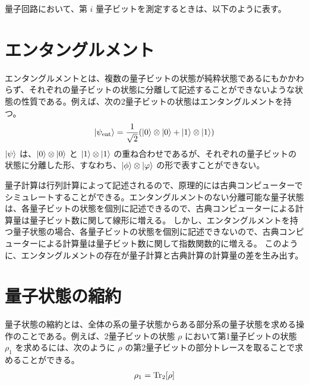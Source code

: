 量子回路において、第 $i$ 量子ビットを測定するときは、以下のように表す。
\begin{figure}[H]
    \centering
\end{figure}



\section{エンタングルメント}\label{sec:entanglement}
エンタングルメントとは、複数の量子ビットの状態が純粋状態であるにもかかわらず、それぞれの量子ビットの状態に分離して記述することができないような状態の性質である。例えば、次の2量子ビットの状態はエンタングルメントを持つ。
\begin{align}
    \ket{\psi_{\mathrm{ent}}} = \frac{1}{\sqrt{2}}(\ket{0}\otimes\ket{0} + \ket{1}\otimes\ket{1})
\end{align}
$\ket{\psi}$ は、$\ket{0}\otimes\ket{0}$ と $\ket{1}\otimes\ket{1}$ の重ね合わせであるが、それぞれの量子ビットの状態に分離した形、すなわち、$\ket{\phi} \otimes \ket{\varphi}$ の形で表すことができない。

量子計算は行列計算によって記述されるので、原理的には古典コンピューターでシミュレートすることができる。エンタングルメントのない分離可能な量子状態は、各量子ビットの状態を個別に記述できるので、古典コンピューターによる計算量は量子ビット数に関して線形に増える。
しかし、エンタングルメントを持つ量子状態の場合、各量子ビットの状態を個別に記述できないので、古典コンピューターによる計算量は量子ビット数に関して指数関数的に増える。
このように、エンタングルメントの存在が量子計算と古典計算の計算量の差を生み出す。



\section{量子状態の縮約}
量子状態の縮約とは、全体の系の量子状態からある部分系の量子状態を求める操作のことである。例えば、2量子ビットの状態 $\rho$ において第1量子ビットの状態 $\rho_1$ を求めるには、次のように $\rho$ の第2量子ビットの部分トレースを取ることで求めることができる。
\begin{align}
    \rho_1 = \Tr_2[\rho]
\end{align}

